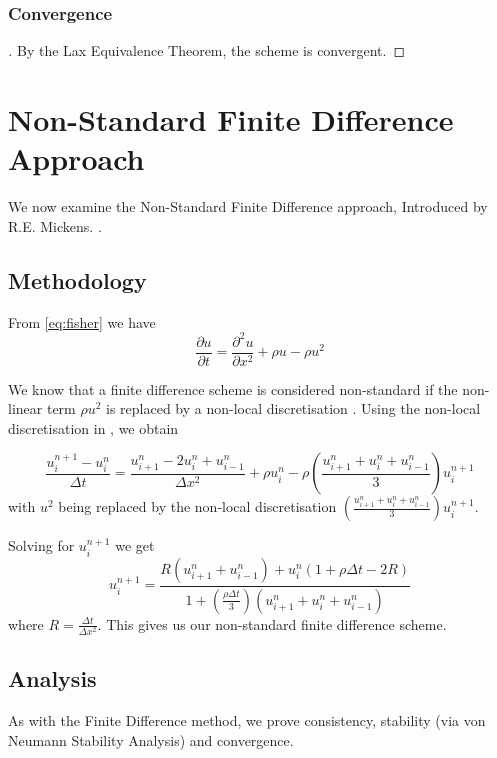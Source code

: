 \documentclass[a4paper]{article}
\begin{document}
	\subsubsection{Convergence}
	\begin{proof}[]
	    By the Lax Equivalence Theorem, the scheme is convergent.
	\end{proof}

\section{Non-Standard Finite Difference Approach}\label{sec:Alt}
    We now examine the Non-Standard Finite Difference approach, Introduced by R.E. Mickens. \cite{mickens}. 
	\subsection{Methodology}\label{sec:Altmethods}
		From \ref{eq:fisher} we have
		\begin{equation*}
		    \frac{\partial u}{\partial t} = \frac{\partial^2 u}{\partial x^2} + \rho u- \rho u^2
		\end{equation*}
		
		
		We know that a finite difference scheme is considered non-standard if the non-linear term $\rho u^2$ is replaced by a non-local discretisation \cite{anguelov}. 
		Using the non-local discretisation in \cite{mickens}, we obtain 

		\begin{equation}\label{eq:almostNonStandard}
		   \frac{u_i^{n+1} -u_i^{n} }{\Delta t} = \frac{u_{i+1}^n - 2u_i^n + u_{i-1}^n }{\Delta x^2}+\rho u_i^n-\rho (\frac{u_{i+1}^n + u_i^n + u_{i-1}^n}{3})u_i^{n+1}
		\end{equation}
		with $u^2$ being replaced by the non-local discretisation $(\frac{u_{i+1}^n + u_i^n + u_{i-1}^n}{3})u_i^{n+1}$.
		
		Solving for $u_i^{n+1}$ we get
        \begin{equation}\label{eq:nonStandardScheme}
		    u_i^{n+1} = \frac{R(u_{i+1}^n + u_{i-1}^n) + u_i^n(1+\rho \Delta t -2R)}{1+(\frac{\rho \Delta t}{3})(u_{i+1}^n + u_i^n + u_{i-1}^n)}
		\end{equation}
		where $R=\frac{\Delta t}{\Delta x^2}$. This gives us our non-standard finite difference scheme.
		
	\subsection{Analysis}\label{sec:Altanalysis}
    	As with the Finite Difference method, we prove consistency, stability (via von Neumann Stability Analysis) and convergence.
\end{document}
